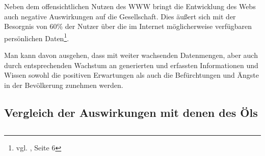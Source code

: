 Neben dem offensichtlichen Nutzen des \ac{WWW} bringt die Entwicklung des Webs auch negative Auswirkungen auf die Gesellschaft. 
Dies äußert sich mit der Besorgnis von 60\% der Nutzer über die im Internet möglicherweise verfügbaren persönlichen Daten\footnote{vgl. \cite{d21}, Seite 6}. 

Man kann davon ausgehen, dass mit weiter wachsenden Datenmengen, aber auch durch entsprechenden Wachstum an generierten und erfassten Informationen und Wissen sowohl die positiven Erwartungen als auch die Befürchtungen und Ängste in der Bevölkerung zunehmen werden.


\subsection{Vergleich der Auswirkungen mit denen des Öls}

\subsection{}
